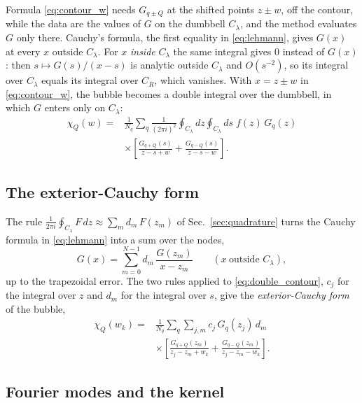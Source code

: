 \documentclass[aps,prb,reprint,a4paper]{revtex4-2}
\begin{document}
Formula \eqref{eq:contour_w} needs $G_{q\pm Q}$ at the shifted points $z\pm w$, off the contour, while the data are the values of $G$ on the dumbbell $C_\lambda$, and the method evaluates $G$ only there. Cauchy's formula, the first equality in \eqref{eq:lehmann}, gives $G(x)$ at every $x$ outside $C_\lambda$. For $x$ \emph{inside} $C_\lambda$ the same integral gives $0$ instead of $G(x)$: then $s\mapsto G(s)/(x-s)$ is analytic outside $C_\lambda$ and $O(s^{-2})$, so its integral over $C_\lambda$ equals its integral over $C_R$, which vanishes. With $x=z\pm w$ in \eqref{eq:contour_w}, the bubble becomes a double integral over the dumbbell, in which $G$ enters only on $C_\lambda$:
\begin{equation}
  \begin{aligned}
  \chi_Q(w)={}&\frac1{N_q}\sum_q\frac1{(2\pi i)^2}\oint_{C_\lambda}dz\oint_{C_\lambda}ds\;f(z)\,G_q(z)\\
  &\times\left[\frac{G_{q+Q}(s)}{z-s+w}+\frac{G_{q-Q}(s)}{z-s-w}\right].
  \end{aligned}
  \label{eq:double_contour}
\end{equation}

\subsection{The exterior-Cauchy form}
\label{app:ext_cauchy}

The rule $\frac1{2\pi i}\oint_{C_\lambda}F\,dz\approx\sum_md_m\,F(z_m)$ of Sec.~\ref{sec:quadrature} turns the Cauchy formula in \eqref{eq:lehmann} into a sum over the nodes,
\begin{equation}
  G(x)=\sum_{m=0}^{N-1}d_m\,\frac{G(z_m)}{x-z_m}\qquad(x\ \text{outside }C_\lambda),
  \label{eq:ext_cauchy}
\end{equation}
up to the trapezoidal error. The two rules applied to \eqref{eq:double_contour}, $c_j$ for the integral over $z$ and $d_m$ for the integral over $s$, give the \emph{exterior-Cauchy form} of the bubble,
\begin{equation}
\begin{aligned}
\chi_Q(w_k)={}&\frac1{N_q}\sum_q\sum_{j,m}c_j\,G_q(z_j)\,d_m\\
&\times\left[\frac{G_{q+Q}(z_m)}{z_j-z_m+w_k}+\frac{G_{q-Q}(z_m)}{z_j-z_m-w_k}\right].
\end{aligned}
\label{eq:cauchy_form}
\end{equation}

\subsection{Fourier modes and the kernel}
\label{sec:modes}
\end{document}
